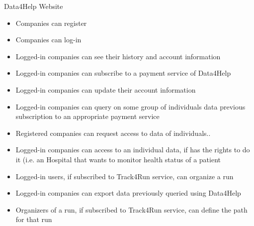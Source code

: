 \noindent Data4Help Website
\begin{itemize}
    \item Companies can register
    \item Companies can log-in
    \item Logged-in companies can see their history and account information
    \item Logged-in companies can subscribe to a payment service of Data4Help
    \item Logged-in companies can update their account information
    \item Logged-in companies can query on some group of individuals data
    previous subscription to an appropriate payment service
    \item Registered companies can request access to data of individuals..
    \item Logged-in companies can access to an individual data, if has the rights to do it (i.e. an Hospital that wants to monitor health status of a patient
    \item Logged-in users, if subscribed to Track4Run service, can organize a run
    \item Logged-in companies can export data previously queried using Data4Help
    \item Organizers of a run, if subscribed to Track4Run service, can define the path for that run
    
\end{itemize}

